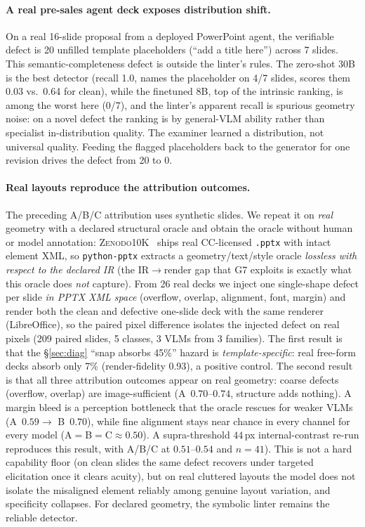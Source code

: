 \documentclass[letterpaper]{article}            %
\newcommand{\g}[1]{\textsf{#1}}        %
\begin{document}
\paragraph{A real pre-sales agent deck exposes distribution shift.}
On a real 16-slide proposal from a deployed PowerPoint agent, the verifiable defect is 20 unfilled template
placeholders (``add a title here'') across 7 slides. This semantic-completeness defect is outside the linter's
rules. The zero-shot 30B is the best detector (recall 1.0, names the placeholder on 4/7 slides, scores them 0.03
vs.\ 0.64 for clean), while the finetuned 8B, top of the intrinsic ranking, is among the worst here (0/7), and the linter's apparent recall is spurious geometry noise: on a novel defect the ranking is by
general-VLM ability rather than specialist in-distribution quality. The examiner learned a distribution, not
universal quality. Feeding the flagged placeholders back to the generator for one revision drives the defect
from 20 to 0.

\paragraph{Real layouts reproduce the attribution outcomes.}
The preceding A/B/C attribution uses synthetic slides. We repeat it on \emph{real} geometry with a declared
structural oracle and obtain the oracle without human or model annotation:
\textsc{Zenodo10K}~\citep{zenodo10k} ships real CC-licensed \texttt{.pptx} with intact element XML, so
\texttt{python-pptx} extracts a geometry/text/style oracle \emph{lossless with respect to the declared IR}
(the IR$\to$render gap that \g{G7} exploits is exactly what this oracle does \emph{not} capture). From 26 real
decks we inject one single-shape defect per slide \emph{in PPTX XML space} (overflow, overlap, alignment,
font, margin) and render both the clean and defective one-slide deck with the same renderer (LibreOffice), so
the paired pixel difference isolates the injected defect on real pixels (209 paired slides, 5 classes, 3 VLMs
from 3 families). The first result is that the \S\ref{sec:diag} ``snap absorbs 45\%'' hazard is
\emph{template-specific}: real free-form decks absorb only 7\% (render-fidelity 0.93), a positive control. The second result is that all three attribution outcomes appear on real geometry: coarse defects
(overflow, overlap) are image-sufficient (A~$0.70$--$0.74$, structure adds nothing). A margin bleed is a
perception bottleneck that the oracle rescues for weaker VLMs (A~$0.59 \to$ B~$0.70$), while fine alignment stays
near chance in every channel for every model (A$=$B$=$C$\approx 0.50$). A supra-threshold
$44$\,px internal-contrast re-run reproduces this result, with A/B/C at $0.51$--$0.54$ and $n{=}41$). This is
not a hard
capability floor (on clean slides the same defect recovers under targeted elicitation once it clears acuity),
but on real cluttered layouts the model does not isolate the misaligned element reliably among genuine
layout variation, and specificity collapses. For declared geometry, the symbolic linter remains the reliable
detector.
\end{document}
